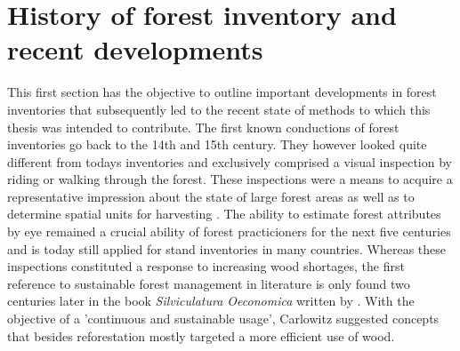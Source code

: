 
\section{History of forest inventory and recent developments}
\label{sec:intro:hist_soa}

This first section has the objective to outline important developments in forest inventories that subsequently led to the recent state of methods to which this thesis was intended to contribute. 
The first known conductions of forest inventories go back to the 14th and 15th century. They however looked quite different from todays inventories and exclusively comprised a visual inspection by riding or walking through the forest. These inspections were a means to acquire a representative impression about the state of large forest areas as well as to determine spatial units for harvesting \citep{zoehrer1980}. The ability to estimate forest attributes by eye remained a crucial ability of forest practicioners for the next five centuries and is today still applied for stand inventories in many countries. Whereas these inspections constituted a response to increasing wood shortages, the first reference to sustainable forest management in literature is only found two centuries later in the book \textit{Silviculatura Oeconomica} written by \citet{carlowitz1713}. With the objective of a 'continuous and sustainable usage', Carlowitz suggested concepts that besides reforestation mostly targeted a more efficient use of wood.\par

